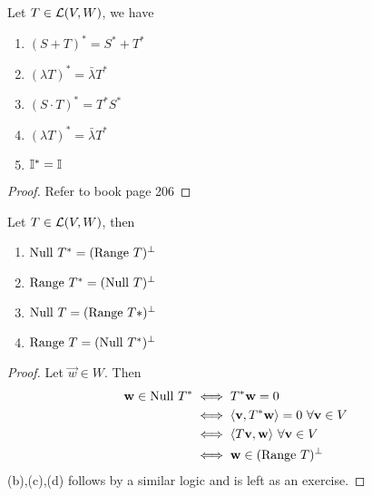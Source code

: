 \begin{theorem}
Let $T \in \mathcal L(V,W)$, we have
	\begin{enumerate}
		\item $(S + T)^* = S^* + T^*$
		\item $(\lambda T)^* = \bar \lambda T^*$
		\item $(S \cdot T)^* = T^*S^*$
		\item $(\lambda T)^* = \bar \lambda T^*$
		\item $\mathbb I^* = \mathbb I$
	\end{enumerate}
\end{theorem}
\begin{proof} Refer to book page 206
\end{proof}
\begin{theorem}
Let $T \in \mathcal L(V,W)$, then
	\begin{enumerate}
		\item $\text{Null } T^* = (\text{Range } T)^\perp$
		\item $\text{Range } T^* = (\text{Null } T)^\perp$
		\item $\text{Null } T = (\text{Range } T*)^\perp$
		\item $\text{Range } T = (\text{Null } T^*)^\perp$
	\end{enumerate}
\end{theorem}
\begin{proof}
Let $\vec w \in W$. Then 
\begin{align*}
	\mathbf w \in \text{Null } T^* &\iff T^* \mathbf w = 0 \\
	&\iff \langle \mathbf v, T^* \mathbf w \rangle = 0 \ \forall \mathbf v \in V \\
	&\iff \langle T\mathbf v, \mathbf w \rangle \ \forall \mathbf v \in V \\
	&\iff \mathbf w \in (\text{Range } T)^\perp
\end{align*}
(b),(c),(d) follows by a similar logic and is left as an exercise.
\end{proof}

